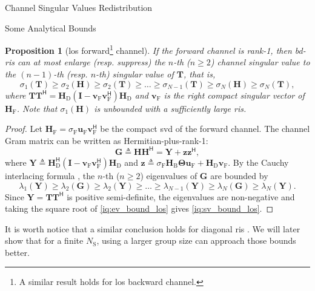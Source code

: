 \documentclass[journal]{IEEEtran}
\newtheorem{proposition}{Proposition}
\begin{document}
\begin{section}{Channel Singular Values Redistribution}
\begin{subsection}{Some Analytical Bounds}
		\begin{proposition}[\gls{los} forward\footnote{A similar result holds for \gls{los} backward channel.} channel]\label{pp:los}
			If the forward channel is rank-1, then \gls{bd}-\gls{ris} can at most enlarge (resp. suppress) the $n$-th ($n \ge 2$) channel singular value to the $(n-1)$-th (resp. $n$-th) singular value of $\mathbf{T}$, that is,
			\begin{equation}
				\sigma_1(\mathbf{T}) \ge {\sigma_2(\mathbf{H})} \ge \sigma_2(\mathbf{T}) \ge \ldots \ge \sigma_{N-1}(\mathbf{T}) \ge {\sigma_N(\mathbf{H})} \ge \sigma_N(\mathbf{T}),
				\label{iq:sv_bound_los}
			\end{equation}
			where $\mathbf{T} \mathbf{T}^\mathsf{H} = \mathbf{H}_\mathrm{D} (\mathbf{I} - \mathbf{v}_\mathrm{F} \mathbf{v}_\mathrm{F}^\mathsf{H}) \mathbf{H}_\mathrm{D}$ and $\mathbf{v}_\mathrm{F}$ is the right compact singular vector of $\mathbf{H}_\mathrm{F}$.
			Note that $\sigma_1(\mathbf{H})$ is unbounded with a sufficiently large \gls{ris}.
		\end{proposition}
		\begin{proof}
			Let $\mathbf{H}_\mathrm{F} = \sigma_\mathrm{F} \mathbf{u}_\mathrm{F} \mathbf{v}_\mathrm{F}^\mathsf{H}$ be the compact \gls{svd} of the forward channel.
			The channel Gram matrix can be written as Hermitian-plus-rank-1:
			\begin{equation}
				\mathbf{G} \triangleq \mathbf{H} \mathbf{H}^\mathsf{H} = \mathbf{Y} + \mathbf{z} \mathbf{z}^\mathsf{H},
			\end{equation}
			where $\mathbf{Y} \triangleq \mathbf{H}_\mathrm{D}^\mathsf{H} (\mathbf{I} - \mathbf{v}_\mathrm{F} \mathbf{v}_\mathrm{F}^\mathsf{H}) \mathbf{H}_\mathrm{D}$ and $\mathbf{z} \triangleq \sigma_\mathrm{F} \mathbf{H}_\mathrm{B} \mathbf{\Theta} \mathbf{u}_\mathrm{F} + \mathbf{H}_\mathrm{D} \mathbf{v}_\mathrm{F}$.
			By the Cauchy interlacing formula \cite{Golub2013}, the $n$-th ($n \ge 2$) eigenvalues of $\mathbf{G}$ are bounded by
			\begin{equation}
				\lambda_1(\mathbf{Y}) \ge \lambda_2(\mathbf{G}) \ge \lambda_2(\mathbf{Y}) \ge \ldots \ge \lambda_{N-1}(\mathbf{Y}) \ge \lambda_N(\mathbf{G}) \ge \lambda_N(\mathbf{Y}).
				\label{iq:ev_bound_los}
			\end{equation}
			Since $\mathbf{Y} = \mathbf{T} \mathbf{T}^\mathsf{H}$ is positive semi-definite, the eigenvalues are non-negative and taking the square root of \eqref{iq:ev_bound_los} gives \eqref{iq:sv_bound_los}.
		\end{proof}
		It is worth notice that a similar conclusion holds for diagonal \gls{ris} \cite{Semmler2023}.
		We will later show that for a finite $N_\mathrm{S}$, using a larger group size can approach those bounds better.


\end{subsection}
\end{section}
\end{document}
